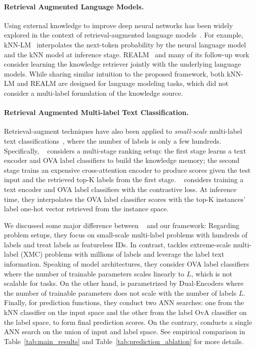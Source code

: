 \paragraph{Retrieval Augmented Language Models.}
Using external knowledge to improve deep neural networks has been widely explored in the context of retrieval-augmented language models~\citep{khandelwal2020generalization, guu2020retrieval,lewis2020retrieval,izacard2023atlas,borgeaud2022improving,shi2023replug}.
For example, kNN-LM~\citep{khandelwal2020generalization} interpolates the next-token probability by the neural language model and the kNN model at inference stage. REALM~\citep{guu2020retrieval} and many of its follow-up work~\citep{izacard2023atlas,borgeaud2022improving} consider learning the knowledge retriever jointly with the underlying language models. 
While sharing similar intuition to the proposed \RAEXMC framework, both kNN-LM and REALM are designed for language modeling tasks, which did not consider a multi-label formulation of the knowledge source.

\vspace{-0.2em}
\paragraph{Retrieval Augmented Multi-label Text Classification.}
Retrieval-augment techniques have also been applied to \textit{small-scale} multi-label text classifications~\citep{chalkidis2023retrieval,wang2022contrastive},
where the number of labels is only a few hundreds.
Specifically, ~\citet{chalkidis2023retrieval} considers a multi-stage ranking setup: the first stage learns a text encoder and OVA label classifiers to build the knowledge memory; the second stage trains an expensive cross-attention encoder to produce scores given the test input and the retrieved top-K labels from the first stage.
~\citet{wang2022contrastive} considers training a text encoder and OVA label classifiers with the contrastive loss.
At inference time, they interpolates the OVA label classifier scores with the  top-K instances' label one-hot vector retrieved from the instance space.

We discussed some major difference between ~\citet{wang2022contrastive} and our \RAEXMC framework:
Regarding problem setups, they focus on small-scale multi-label problems with hundreds of labels and treat labels as featureless IDs.
In contrast, \RAEXMC tackles extreme-scale multi-label (XMC) problems with millions of labels and leverage the label text information. 
Speaking of model architectures, they consider OVA label classifiers where the number of trainable parameters scales linearly to $L$, which is not scalable for \XMC tasks.
On the other hand, \RAEXMC is parametrized by Dual-Encoders where the number of trainable parameters does not scale with the number of labels $L$.
Finally, for prediction functions, they conduct two ANN searches: one from the kNN classifier on the input space and the other from the label OvA classifier on the label space, to form final prediction scores.
On the contrary, \RAEXMC conducts a single ANN search on the union of input and label space.
See empirical comparison in Table~\ref{tab:main_results} and Table~\ref{tab:prediction_ablation} for more details.
